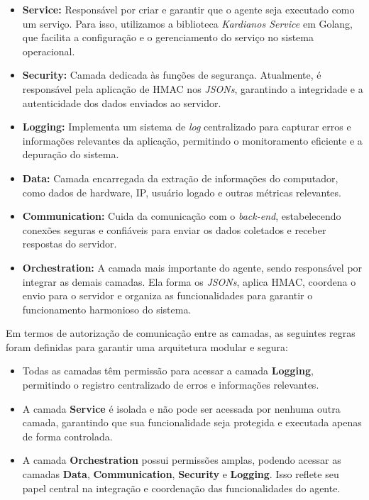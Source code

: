 \begin{itemize}
    \item \textbf{Service:} Responsável por criar e garantir que o agente seja executado como um serviço. Para isso, utilizamos a biblioteca \textit{Kardianos Service} em Golang, que facilita a configuração e o gerenciamento do serviço no sistema operacional.
    
    \item \textbf{Security:} Camada dedicada às funções de segurança. Atualmente, é responsável pela aplicação de HMAC nos \textit{JSONs}, garantindo a integridade e a autenticidade dos dados enviados ao servidor.
    
    \item \textbf{Logging:} Implementa um sistema de \textit{log} centralizado para capturar erros e informações relevantes da aplicação, permitindo o monitoramento eficiente e a depuração do sistema.
    
    \item \textbf{Data:} Camada encarregada da extração de informações do computador, como dados de hardware, IP, usuário logado e outras métricas relevantes.
    
    \item \textbf{Communication:} Cuida da comunicação com o \textit{back-end}, estabelecendo conexões seguras e confiáveis para enviar os dados coletados e receber respostas do servidor.
    
    \item \textbf{Orchestration:} A camada mais importante do agente, sendo responsável por integrar as demais camadas. Ela forma os \textit{JSONs}, aplica HMAC, coordena o envio para o servidor e organiza as funcionalidades para garantir o funcionamento harmonioso do sistema.
\end{itemize}
Em termos de autorização de comunicação entre as camadas, as seguintes regras foram definidas para garantir uma arquitetura modular e segura:

\begin{itemize}
    \item Todas as camadas têm permissão para acessar a camada \textbf{Logging}, permitindo o registro centralizado de erros e informações relevantes.
    \item A camada \textbf{Service} é isolada e não pode ser acessada por nenhuma outra camada, garantindo que sua funcionalidade seja protegida e executada apenas de forma controlada.
    \item A camada \textbf{Orchestration} possui permissões amplas, podendo acessar as camadas \textbf{Data}, \textbf{Communication}, \textbf{Security} e \textbf{Logging}. Isso reflete seu papel central na integração e coordenação das funcionalidades do agente.
\end{itemize}

